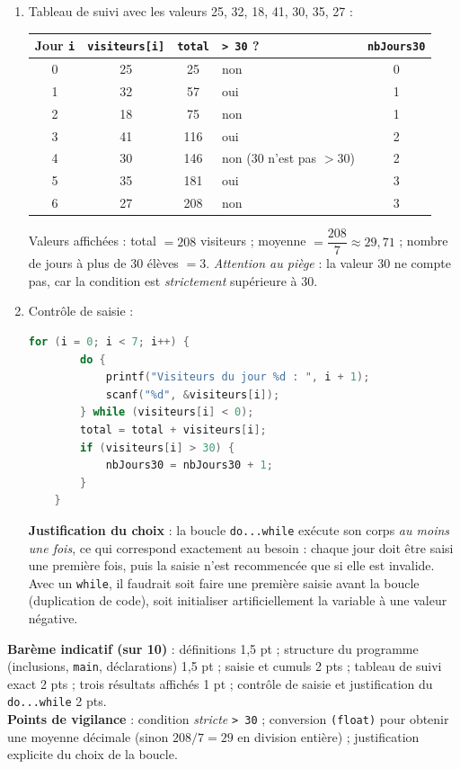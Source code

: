 \documentclass[11pt]{article}
\begin{document}
\begin{corrige}
\begin{enumerate}
\begin{lstlisting}[language=C]
    printf("Total de la semaine : %d visiteurs\n", total);
    printf("Moyenne journaliere : %.2f\n", moyenne);
    printf("Jours a plus de 30 eleves : %d\n", nbJours30);
    return 0;
}
\end{lstlisting}
\item Tableau de suivi avec les valeurs 25, 32, 18, 41, 30, 35, 27 :
\begin{center}
\begin{tabularx}{\linewidth}{|c|c|c|X|c|}
\hline
\rowcolor{popblueL} Jour \texttt{i} & \texttt{visiteurs[i]} & \texttt{total} & \texttt{> 30} ? & \texttt{nbJours30} \\
\hline
0 & 25 & 25 & non & 0 \\
\hline
1 & 32 & 57 & oui & 1 \\
\hline
2 & 18 & 75 & non & 1 \\
\hline
3 & 41 & 116 & oui & 2 \\
\hline
4 & 30 & 146 & non (30 n'est pas $> 30$) & 2 \\
\hline
5 & 35 & 181 & oui & 3 \\
\hline
6 & 27 & 208 & non & 3 \\
\hline
\end{tabularx}
\end{center}
Valeurs affichées : total $= 208$ visiteurs ; moyenne $= \dfrac{208}{7} \approx 29{,}71$ ; nombre de jours à plus de 30 élèves $= 3$. \emph{Attention au piège} : la valeur 30 ne compte pas, car la condition est \emph{strictement} supérieure à 30.
\item Contrôle de saisie :
\begin{lstlisting}[language=C]
    for (i = 0; i < 7; i++) {
        do {
            printf("Visiteurs du jour %d : ", i + 1);
            scanf("%d", &visiteurs[i]);
        } while (visiteurs[i] < 0);
        total = total + visiteurs[i];
        if (visiteurs[i] > 30) {
            nbJours30 = nbJours30 + 1;
        }
    }
\end{lstlisting}
\textbf{Justification du choix} : la boucle \texttt{do...while} exécute son corps \emph{au moins une fois}, ce qui correspond exactement au besoin : chaque jour doit être saisi une première fois, puis la saisie n'est recommencée que si elle est invalide. Avec un \texttt{while}, il faudrait soit faire une première saisie avant la boucle (duplication de code), soit initialiser artificiellement la variable à une valeur négative.
\end{enumerate}
\textbf{Barème indicatif (sur 10)} : définitions 1,5 pt ; structure du programme (inclusions, \texttt{main}, déclarations) 1,5 pt ; saisie et cumuls 2 pts ; tableau de suivi exact 2 pts ; trois résultats affichés 1 pt ; contrôle de saisie et justification du \texttt{do...while} 2 pts.\\
\textbf{Points de vigilance} : condition \emph{stricte} \texttt{> 30} ; conversion \texttt{(float)} pour obtenir une moyenne décimale (sinon $208/7 = 29$ en division entière) ; justification explicite du choix de la boucle.
\end{corrige}
\end{document}
